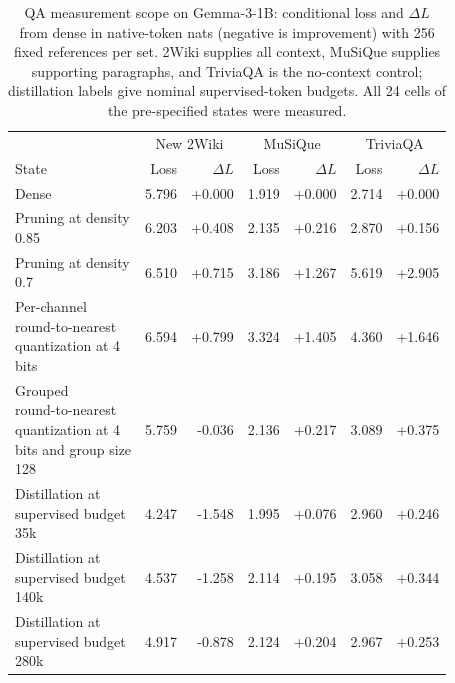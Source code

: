 \begin{table}[!htbp]\normalfont
\centering
\small
\caption{QA measurement scope on Gemma-3-1B: conditional loss and $\Delta L$ from dense in native-token nats (negative is improvement) with 256 fixed references per set. 2Wiki supplies all context, MuSiQue supplies supporting paragraphs, and TriviaQA is the no-context control; distillation labels give nominal supervised-token budgets. All 24 cells of the \mbox{pre-specified} states were measured.}
\label{tab:qa_scope}
\begin{tabular*}{\textwidth}{@{\extracolsep{\fill}}lrrrrrr@{}}
\toprule
& \multicolumn{2}{c}{New 2Wiki} & \multicolumn{2}{c}{MuSiQue} & \multicolumn{2}{c}{TriviaQA} \\
State & Loss & $\Delta L$ & Loss & $\Delta L$ & Loss & $\Delta L$ \\
\midrule
Dense & 5.796 & +0.000 & 1.919 & +0.000 & 2.714 & +0.000 \\
\shortstack[l]{Pruning at density\\0.85} & 6.203 & +0.408 & 2.135 & +0.216 & 2.870 & +0.156 \\
\shortstack[l]{Pruning at density\\0.7} & 6.510 & +0.715 & 3.186 & +1.267 & 5.619 & +2.905 \\
\shortstack[l]{Per-channel\\round-to-nearest\\quantization at 4\\bits} & 6.594 & +0.799 & 3.324 & +1.405 & 4.360 & +1.646 \\
\shortstack[l]{Grouped\\round-to-nearest\\quantization at 4\\bits and group size\\128} & 5.759 & -0.036 & 2.136 & +0.217 & 3.089 & +0.375 \\
\shortstack[l]{Distillation at\\supervised budget\\35k} & 4.247 & -1.548 & 1.995 & +0.076 & 2.960 & +0.246 \\
\shortstack[l]{Distillation at\\supervised budget\\140k} & 4.537 & -1.258 & 2.114 & +0.195 & 3.058 & +0.344 \\
\shortstack[l]{Distillation at\\supervised budget\\280k} & 4.917 & -0.878 & 2.124 & +0.204 & 2.967 & +0.253 \\
\bottomrule
\end{tabular*}
\end{table}
